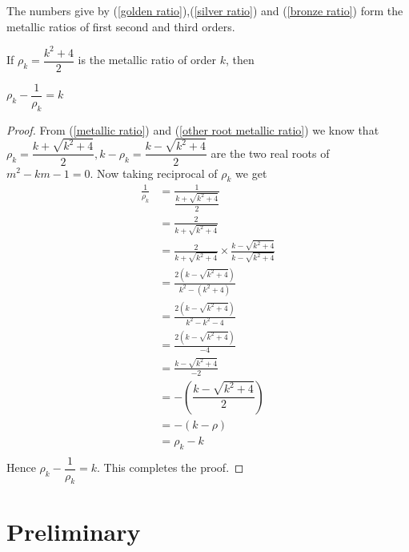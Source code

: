 \documentclass{rmutt-seminar}
\begin{document}
The numbers give by (\ref{golden ratio}),(\ref{silver ratio}) and (\ref{bronze ratio}) form the metallic ratios of first second and third orders.
\pagebreak
\begin{lemma}\label{lemma}
	\textnormal{If} $\rho_{k}= \dfrac{k^2 + 4}{2} $ \textnormal{is the metallic ratio of order} $ k $, \textnormal{then}
	\begin{center}
		$ \rho_{k} - \dfrac{1}{\rho_{k}}=k$ 
	\end{center}
\end{lemma}	
\begin{proof}
	From (\ref{metallic ratio}) and (\ref{other root metallic ratio}) we know that $\rho_{k} = \dfrac{k+\sqrt{k^2+4}}{2}, k - \rho_{k} = \dfrac{k-\sqrt{k^2 + 4}}{2}$ are the two real roots of $ m^2 - km -1 = 0 $. Now taking reciprocal of $ \rho_{k} $ we get 
	\begin{align*}
		\frac{1}{\rho_k} &= \frac{1 }{\dfrac{k+\sqrt{k^2 +4}}{2}} \\
		&=\frac{2}{k + \sqrt{k^2 + 4}} \\
		&=\frac{2}{k + \sqrt{k^2 + 4}} \times \frac{k-\sqrt{k^2 + 4}}{k-\sqrt{k^2 + 4}} \\
		&= \frac{2(k - \sqrt{k^2 + 4})}{k^2-(k^2+4)} \\
		&= \frac{2(k - \sqrt{k^2 + 4})}{k^2 - k^2 -4}\\
		&= \frac{2(k - \sqrt{k^2 + 4})}{-4}\\
		&= \frac{k - \sqrt{k^2 + 4}}{-2}\\
		&= - \left (\dfrac{k-\sqrt{k^2 + 4}}{2} \right)\\
		&= -(k-\rho) \\
		&= \rho_k-k\\
	\end{align*}
Hence $\rho_k-\dfrac{1}{\rho_k}=k$. This completes the proof.
\end{proof}
\section{Preliminary}
\end{document}
